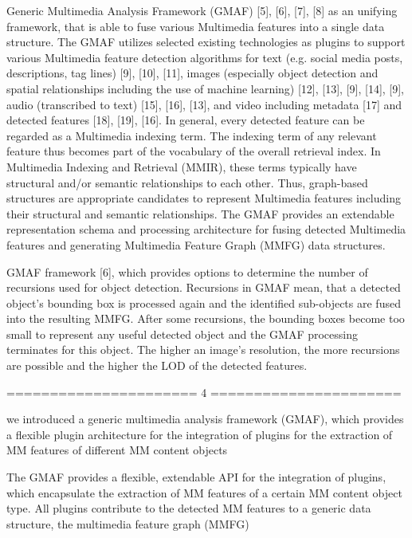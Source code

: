 Generic Multimedia Analysis Framework (GMAF) [5], [6], [7], [8] as an unifying framework, that is able to fuse various Multimedia features into a single data structure. 
The GMAF utilizes selected existing technologies as plugins to support various Multimedia feature detection algorithms for text (e.g. social media posts, descriptions, tag lines) [9], [10], [11], images (especially object detection and spatial relationships including the use of machine learning) [12], [13], [9], [14], [9], audio (transcribed to text) [15], [16], [13], and video including metadata [17] and detected features [18], [19], [16]. 
In general, every detected feature can be regarded as a Multimedia indexing term. 
The indexing term of any relevant feature thus becomes part of the vocabulary of the overall retrieval index. 
In Multimedia Indexing and Retrieval (MMIR), these terms typically have structural and/or semantic relationships to each other. 
Thus, graph-based structures are appropriate candidates to represent Multimedia features including their structural and semantic relationships. 
The GMAF provides an extendable representation schema and processing architecture for fusing detected Multimedia features and generating Multimedia Feature Graph (MMFG) data structures.

GMAF framework [6], which provides options to determine the number of recursions used for object detection.
Recursions in GMAF mean, that a detected object’s bounding box is processed again and the identified sub-objects are fused into the resulting MMFG. 
After some recursions, the bounding boxes become too small to represent any useful detected object and the GMAF processing terminates for this object. 
The higher an image’s resolution, the more recursions are possible and the higher the LOD of the detected features.

====================== 4
======================

we introduced a generic multimedia analysis framework (GMAF), which provides a flexible plugin architecture for the integration of plugins for the extraction of MM features of different MM content objects

The GMAF provides a flexible, extendable API for the integration of plugins, which encapsulate the extraction of MM features of a certain MM content object type. All plugins contribute to the detected MM features to a generic data structure, the multimedia feature graph (MMFG)


